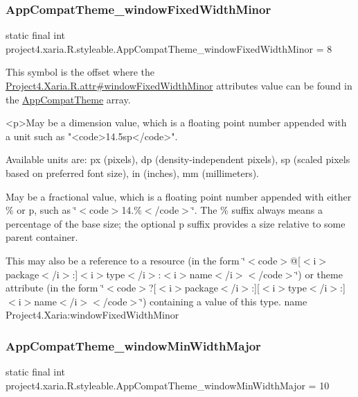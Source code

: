 \subsubsection{\texorpdfstring{App\+Compat\+Theme\+\_\+window\+Fixed\+Width\+Minor}{AppCompatTheme\_windowFixedWidthMinor}}
{\footnotesize\ttfamily static final int project4.\+xaria.\+R.\+styleable.\+App\+Compat\+Theme\+\_\+window\+Fixed\+Width\+Minor = 8\hspace{0.3cm}{\ttfamily [static]}}

This symbol is the offset where the \hyperlink{}{Project4.\+Xaria.\+R.\+attr\#window\+Fixed\+Width\+Minor} attribute\textquotesingle{}s value can be found in the \hyperlink{classproject4_1_1xaria_1_1R_1_1styleable_aad8bec413e2350f9404e6ff0e831a85d}{App\+Compat\+Theme} array.

\begin{DoxyVerb}      <p>May be a dimension value, which is a floating point number appended with a unit such as "<code>14.5sp</code>".
\end{DoxyVerb}
 Available units are\+: px (pixels), dp (density-\/independent pixels), sp (scaled pixels based on preferred font size), in (inches), mm (millimeters). 

May be a fractional value, which is a floating point number appended with either \% or p, such as \char`\"{}$<$code$>$14.\%$<$/code$>$\char`\"{}. The \% suffix always means a percentage of the base size; the optional p suffix provides a size relative to some parent container. 

This may also be a reference to a resource (in the form \char`\"{}$<$code$>$@\mbox{[}$<$i$>$package$<$/i$>$\+:\mbox{]}$<$i$>$type$<$/i$>$\+:$<$i$>$name$<$/i$>$$<$/code$>$\char`\"{}) or theme attribute (in the form \char`\"{}$<$code$>$?\mbox{[}$<$i$>$package$<$/i$>$\+:\mbox{]}\mbox{[}$<$i$>$type$<$/i$>$\+:\mbox{]}$<$i$>$name$<$/i$>$$<$/code$>$\char`\"{}) containing a value of this type.  name Project4.\+Xaria\+:window\+Fixed\+Width\+Minor \mbox{\label{classproject4_1_1xaria_1_1R_1_1styleable_a1800907132f2a32eb4cf09127ecc7edc}} 
\subsubsection{\texorpdfstring{App\+Compat\+Theme\+\_\+window\+Min\+Width\+Major}{AppCompatTheme\_windowMinWidthMajor}}
{\footnotesize\ttfamily static final int project4.\+xaria.\+R.\+styleable.\+App\+Compat\+Theme\+\_\+window\+Min\+Width\+Major = 10\hspace{0.3cm}{\ttfamily [static]}}

